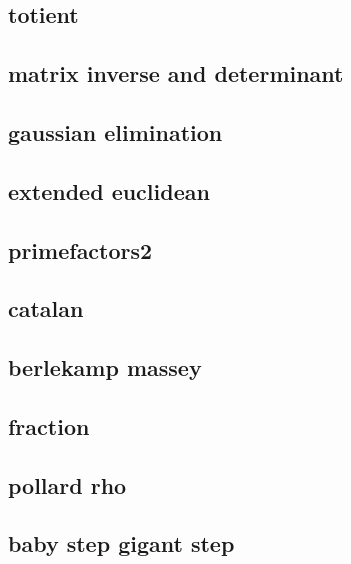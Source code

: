 \subsection{totient}
\raggedbottom
\hrulefill
\subsection{matrix inverse and determinant}
\raggedbottom
\hrulefill
\subsection{gaussian elimination}
\raggedbottom
\hrulefill
\subsection{extended euclidean}
\raggedbottom
\hrulefill
\subsection{primefactors2}
\raggedbottom
\hrulefill
\subsection{catalan}
\raggedbottom
\hrulefill
\subsection{berlekamp massey}
\raggedbottom
\hrulefill
\subsection{fraction}
\raggedbottom
\hrulefill
\subsection{pollard rho}
\raggedbottom
\hrulefill
\subsection{baby step gigant step}
\raggedbottom
\hrulefill
